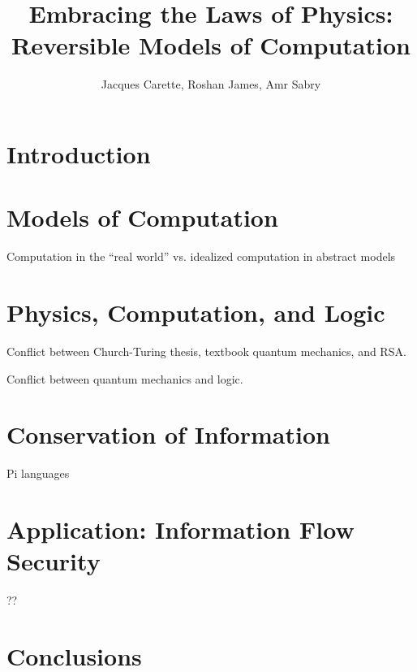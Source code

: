 \documentclass{article}
\title{Embracing the Laws of Physics: \\ Reversible Models of Computation}
\author{Jacques Carette, Roshan James, Amr Sabry}
\begin{document}
\maketitle 

\section{Introduction}

\section{Models of Computation}

Computation in the ``real world'' vs. idealized computation in abstract models

\section{Physics, Computation, and Logic}

Conflict between Church-Turing thesis, textbook quantum mechanics, and RSA. 

Conflict between quantum mechanics and logic.

\section{Conservation of Information}

Pi languages

\section{Application: Information Flow Security}

??

\section{Conclusions}

\end{document}
